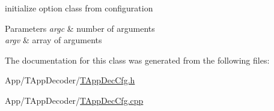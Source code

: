 initialize option class from configuration 


\begin{DoxyParams}{Parameters}
{\em argc} & number of arguments \\
\hline
{\em argv} & array of arguments \\
\hline
\end{DoxyParams}


The documentation for this class was generated from the following files\+:\begin{DoxyCompactItemize}
\item 
App/\+T\+App\+Decoder/\hyperlink{_t_app_dec_cfg_8h}{T\+App\+Dec\+Cfg.\+h}\item 
App/\+T\+App\+Decoder/\hyperlink{_t_app_dec_cfg_8cpp}{T\+App\+Dec\+Cfg.\+cpp}\end{DoxyCompactItemize}
